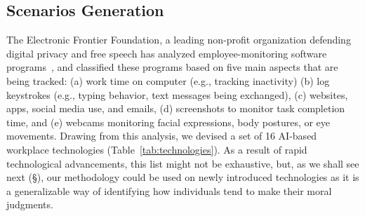 \subsection{Scenarios Generation}
\label{sec:workplace_technologies}
The Electronic Frontier Foundation, a leading non-profit organization defending digital privacy and free speech has analyzed employee-monitoring software programs~\cite{eef_analysis}, and classified these programs based on five main aspects that are being tracked: (a) work time on computer (e.g., tracking inactivity) (b) log keystrokes (e.g., typing behavior, text messages being exchanged), (c) websites, apps, social media use, and emails, (d) screenshots to monitor task completion time, and (e) webcams monitoring facial expressions, body postures, or eye movements. Drawing from this analysis, we devised a set of 16 AI-based workplace technologies (Table~\ref{tab:technologies}). As a result of rapid technological advancements, this list might not be exhaustive, but, as we shall see next (\S{}), our methodology could be used on newly introduced technologies as it is a generalizable way of identifying how individuals tend to make their moral judgments.


